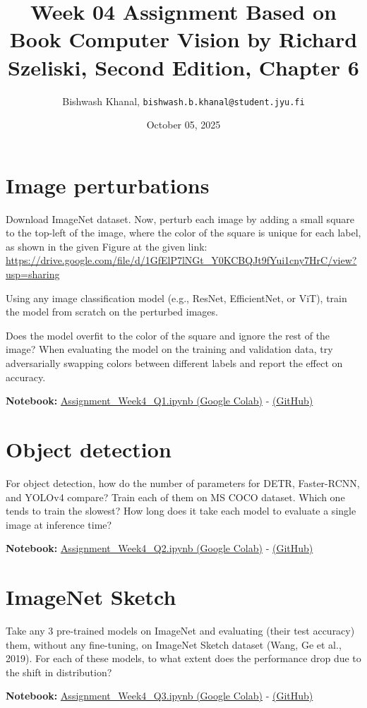\documentclass[12pt,a4paper]{article}
\title{Week 04 Assignment Based on Book Computer Vision by Richard Szeliski, Second Edition, Chapter 6}
\author{Bishwash Khanal, \texttt{bishwash.b.khanal@student.jyu.fi}}
\date{October 05, 2025}
\begin{document}
\maketitle

\section{Image perturbations}
Download ImageNet dataset. Now, perturb each image by adding a small square to the top-left of the image, where the color of the square is unique for 
each label, as shown in the given Figure at the given link: \url{https://drive.google.com/file/d/1GfElP7lNGt_Y0KCBQJt9fYui1cny7HrC/view?usp=sharing}


Using any image classification model (e.g., ResNet, EfficientNet, or ViT), train the model from scratch on the perturbed images.


Does the model overfit to the color of the square and ignore the rest of the image? When evaluating the model on the training and validation data, 
try adversarially swapping colors between different labels and report the effect on accuracy.

\textbf{Notebook:} \href{https://colab.research.google.com/drive/1own6DpmdM8Nlx5oqRM8h9s4naU_R6tED?usp=sharing}{Assignment\_Week4\_Q1.ipynb (Google Colab)} - \href{https://github.com/bkhanal-11/ties411_cvip_jyu/blob/master/assignment4/src/Assignment_Week4_Q1.ipynb}{(GitHub)}


\section{Object detection}
For object detection, how do the number of parameters for DETR, Faster-RCNN, and YOLOv4 compare? Train each of them on MS COCO dataset. 
Which one tends to train the slowest? How long does it take each model to evaluate a single image at inference time?

\textbf{Notebook:} \href{https://colab.research.google.com/drive/15lZexKpMhi8YTQSRUhzudx96gLgtdNkc?usp=sharing}{Assignment\_Week4\_Q2.ipynb (Google Colab)} - \href{https://github.com/bishwashkhanal/assignment4/blob/main/assignment4/src/Assignment_Week4_Q2.ipynb}{(GitHub)}

\section{ImageNet Sketch}
Take any 3 pre-trained models on ImageNet and evaluating (their test accuracy) them, without any fine-tuning, on ImageNet Sketch dataset 
(Wang, Ge et al., 2019). For each of these models, to what extent does the performance drop due to the shift in distribution?

\textbf{Notebook:} \href{https://colab.research.google.com/drive/1iXdk22CjFKFREb8IFVXQX4Lbwdluaqp-?usp=sharing}{Assignment\_Week4\_Q3.ipynb (Google Colab)} - \href{https://github.com/bishwashkhanal/assignment4/blob/main/assignment4/src/Assignment_Week4_Q3.ipynb}{(GitHub)}
\end{document}
